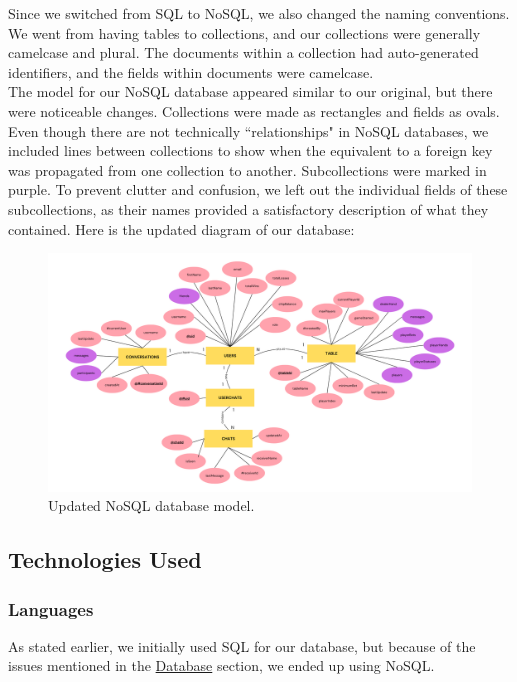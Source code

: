 \noindent Since we switched from SQL to NoSQL, we also changed the naming conventions. We went from having tables to collections, and our collections were generally camelcase and plural. The documents within a collection had auto-generated identifiers, and the fields within documents were camelcase.\\

\noindent The model for our NoSQL database appeared similar to our original, but there were noticeable changes. Collections were made as rectangles and fields as ovals. Even though there are not technically ``relationships" in NoSQL databases, we included lines between collections to show when the equivalent to a foreign key was propagated from one collection to another. Subcollections were marked in purple. To prevent clutter and confusion, we left out the individual fields of these subcollections, as their names provided a satisfactory description of what they contained. Here is the updated diagram of our database:


\begin{figure}[hbt!]
    \centering
    \includegraphics[width=0.8\linewidth]{figures/NoSQL_Database_Model.png}
    \caption{Updated NoSQL database model.}
    \label{fig:NoSQL_Model}
\end{figure}


\pagebreak

\subsection{Technologies Used}

\subsubsection{Languages}
\noindent As stated earlier, we initially used SQL for our database, but because of the issues mentioned in the \hyperref[sec:database]{Database} section, we ended up using NoSQL. \\


